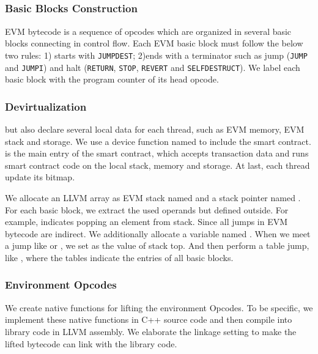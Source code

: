 


\subsection{{\translator}}

\subsubsection{Basic Blocks Construction}
EVM bytecode is a sequence of opcodes which are organized in several basic blocks connecting in control flow.
Each EVM basic block must follow the below two rules: 1) starts with \texttt{JUMPDEST}; 2)ends with a terminator such as jump (\texttt{JUMP} and \texttt{JUMPI}) and halt (\texttt{RETURN}, \texttt{STOP}, \texttt{REVERT} and \texttt{SELFDESTRUCT}).
We label each basic block with the program counter of its head opcode. 


\subsubsection{Devirtualization}
 but also declare several local data for each thread, such as EVM memory, EVM stack and storage. 
We use a device function named  to include the smart contract.  is the main entry of the smart contract, which accepts transaction data and runs smart contract code on the local stack, memory and storage. At last, each thread update its bitmap. 

We allocate an LLVM array as EVM stack named  and a stack pointer named . For each basic block, we extract the used operands but defined outside. For example,  indicates popping an element from stack. 
Since all jumps in EVM bytecode are indirect. We additionally allocate a variable named . When we meet a jump like  or , we set  as the value of stack top. And then perform a table jump, like , where the tables indicate the entries of all basic blocks.


\subsubsection{Environment Opcodes}
We create native functions for lifting the environment Opcodes. To be specific, we implement these native functions in C++ source code and then compile into library code in LLVM assembly. We elaborate the linkage setting to make the lifted bytecode can link with the library code. 

